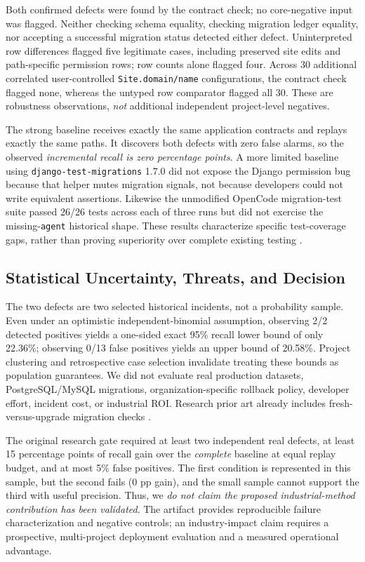 Both confirmed defects were found by the contract check; no core-negative
input was flagged. Neither checking schema equality, checking migration ledger
equality, nor accepting a successful migration status detected either defect.
Uninterpreted row differences flagged five legitimate cases, including
preserved site edits and path-specific permission rows; row counts alone
flagged four. Across 30 additional correlated user-controlled
\texttt{Site.domain/name} configurations, the contract check flagged none,
whereas the untyped row comparator flagged all 30. These are robustness
observations, \emph{not} additional independent project-level negatives.

The strong baseline receives exactly the same application contracts and
replays exactly the same paths. It discovers both defects with zero false
alarms, so the observed \emph{incremental recall is zero percentage points}.
A more limited baseline using \texttt{django-test-migrations} 1.7.0 did not
expose the Django permission bug because that helper mutes migration signals,
not because developers could not write equivalent assertions. Likewise the
unmodified OpenCode migration-test suite passed 26/26 tests across each of
three runs but did not exercise the missing-\texttt{agent} historical shape.
These results characterize specific test-coverage gaps, rather than proving
superiority over complete existing testing \cite{djangoTestMigrations}.

\subsection{Statistical Uncertainty, Threats, and Decision}
The two defects are two selected historical incidents, not a probability
sample. Even under an optimistic independent-binomial assumption, observing
2/2 detected positives yields a one-sided exact 95\% recall lower bound of
only 22.36\%; observing 0/13 false positives yields an upper bound of 20.58\%.
Project clustering and retrospective case selection invalidate treating these
bounds as population guarantees. We did not evaluate real production datasets,
PostgreSQL/MySQL migrations, organization-specific rollback policy, developer
effort, incident cost, or industrial ROI. Research prior art already includes
fresh-versus-upgrade migration checks \cite{artemisMigrations}.

The original research gate required at least two independent real defects,
at least 15 percentage points of recall gain over the \emph{complete} baseline
at equal replay budget, and at most 5\% false positives. The first condition
is represented in this sample, but the second fails (0 pp gain), and the
small sample cannot support the third with useful precision. Thus, we
\emph{do not claim the proposed industrial-method contribution has been
validated}. The artifact provides reproducible failure characterization and
negative controls; an industry-impact claim requires a prospective,
multi-project deployment evaluation and a measured operational advantage.
